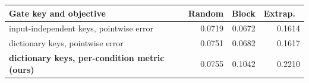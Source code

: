 \small
\begin{tabular}{lrrr}\toprule
Gate key and objective & Random & Block & Extrap.\ \\\midrule
input-independent keys, pointwise error & 0.0719 & 0.0672 & 0.1614 \\
dictionary keys, pointwise error & 0.0751 & 0.0682 & 0.1617 \\
\textbf{dictionary keys, per-condition metric (ours)} & 0.0755 & 0.1042 & 0.2210 \\
\bottomrule\end{tabular}

